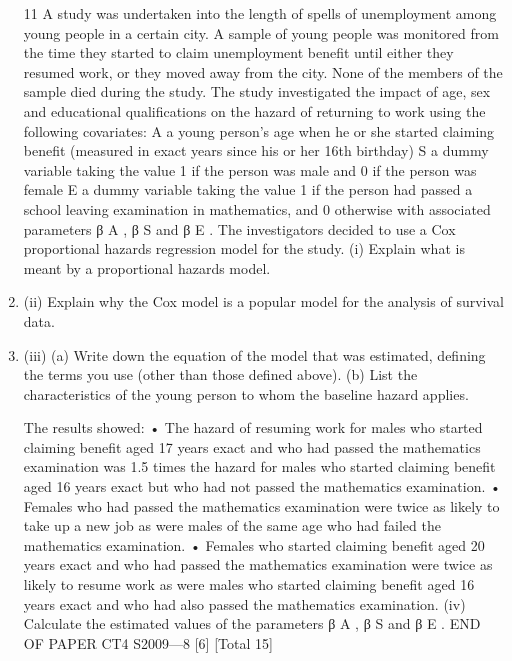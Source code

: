 \documentclass[a4paper,12pt]{article}
\begin{document}
\begin{enumerate}
11
A study was undertaken into the length of spells of unemployment among young
people in a certain city. A sample of young people was monitored from the time they
started to claim unemployment benefit until either they resumed work, or they moved
away from the city. None of the members of the sample died during the study.
The study investigated the impact of age, sex and educational qualifications on the
hazard of returning to work using the following covariates:
A a young person’s age when he or she started claiming benefit (measured in
exact years since his or her 16th birthday)
S a dummy variable taking the value 1 if the person was male and 0 if the person
was female
E a dummy variable taking the value 1 if the person had passed a school leaving
examination in mathematics, and 0 otherwise
with associated parameters β A , β S and β E .
The investigators decided to use a Cox proportional hazards regression model for the
study.
(i) Explain what is meant by a proportional hazards model.

\item (ii) Explain why the Cox model is a popular model for the analysis of survival
data.

\item (iii) (a)
Write down the equation of the model that was estimated, defining
the terms you use (other than those defined above).
(b)
List the characteristics of the young person to whom the baseline
hazard applies.

The results showed:
• The hazard of resuming work for males who started claiming benefit aged 17
years exact and who had passed the mathematics examination was 1.5 times the
hazard for males who started claiming benefit aged 16 years exact but who had
not passed the mathematics examination.
• Females who had passed the mathematics examination were twice as likely to take
up a new job as were males of the same age who had failed the mathematics
examination.
• Females who started claiming benefit aged 20 years exact and who had passed the
mathematics examination were twice as likely to resume work as were males who
started claiming benefit aged 16 years exact and who had also passed the
mathematics examination.
(iv)
Calculate the estimated values of the parameters β A , β S and β E .
END OF PAPER
CT4 S2009—8
[6]
[Total 15]

\newpage


\end{enumerate}
\end{document}
